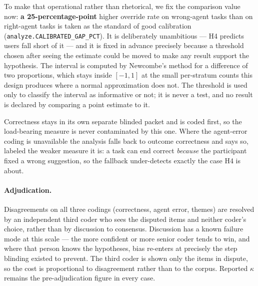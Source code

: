 \documentclass[11pt]{article}
\newcommand{\code}[1]{\texttt{#1}}
\begin{document}
To make that operational rather than rhetorical, we fix the comparison value
now: \textbf{a 25-percentage-point} higher override rate on wrong-agent tasks
than on right-agent tasks is taken as the standard of good calibration
(\code{analyze.CALIBRATED\_GAP\_PCT}). It is deliberately unambitious --- H4
predicts users fall short of it --- and it is fixed in advance precisely because
a threshold chosen after seeing the estimate could be moved to make any result
support the hypothesis. The interval is computed by Newcombe's method for a
difference of two proportions, which stays inside $[-1,1]$ at the small
per-stratum counts this design produces where a normal approximation does not.
The threshold is used only to classify the interval as informative or not; it
is never a test, and no result is declared by comparing a point estimate to it.

Correctness stays in its own separate blinded packet and is coded first, so the
load-bearing measure is never contaminated by this one. Where the agent-error
coding is unavailable the analysis falls back to outcome correctness and says
so, labeled the weaker measure it is: a task can end correct \emph{because} the
participant fixed a wrong suggestion, so the fallback under-detects exactly the
case H4 is about.

\paragraph{Adjudication.} Disagreements on all three codings (correctness,
agent error, themes) are resolved by an independent third coder who sees the
disputed items and neither coder's choice, rather than by discussion to
consensus. Discussion has a known failure mode at this scale --- the more
confident or more senior coder tends to win, and where that person knows the
hypotheses, bias re-enters at precisely the step blinding existed to prevent.
The third coder is shown only the items in dispute, so the cost is proportional
to disagreement rather than to the corpus. Reported $\kappa$ remains the
pre-adjudication figure in every case.
\end{document}
